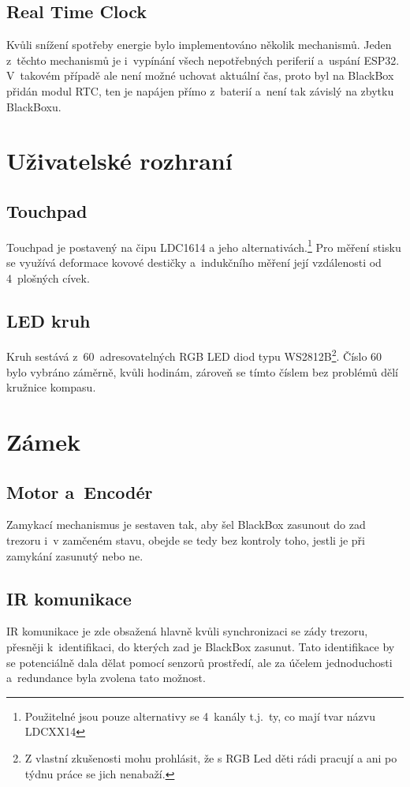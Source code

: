 \subsection{Real Time Clock}
Kvůli snížení spotřeby energie bylo implementováno několik mechanismů.
Jeden z~těchto mechanismů je i~vypínání všech nepotřebných periferií a~uspání ESP32. V~takovém případě ale není možné uchovat aktuální čas, proto byl na BlackBox přidán modul RTC, ten je napájen přímo z~baterií a~není tak závislý na zbytku BlackBoxu.

\section{Uživatelské rozhraní}

\subsection{Touchpad}
Touchpad je postavený na čipu LDC1614 a jeho alternativách.\footnote{Použitelné jsou pouze alternativy se 4~kanály t.j.~ty, co mají tvar názvu LDCXX14}
Pro měření stisku se využívá deformace kovové destičky a~indukčního měření její vzdálenosti od 4~plošných cívek.

\subsection{LED kruh}
Kruh sestává z~60~adresovatelných RGB LED diod typu WS2812B\footnote{Z vlastní zkušenosti mohu prohlásit, že s RGB Led děti rádi pracují a ani po týdnu práce se jich nenabaží.}.
Číslo 60 bylo vybráno záměrně, kvůli hodinám, zároveň se tímto číslem bez problémů dělí kružnice kompasu.


\section{Zámek}

\subsection{Motor a~Encodér}
Zamykací mechanismus je sestaven tak, aby šel BlackBox zasunout do zad trezoru i~v zamčeném stavu, obejde se tedy bez kontroly toho, jestli je při zamykání zasunutý nebo ne.

\subsection{IR komunikace}
IR komunikace je zde obsažená hlavně kvůli synchronizaci se zády trezoru, přesněji k~identifikaci, do kterých zad je BlackBox zasunut.
Tato identifikace by se potenciálně dala dělat pomocí senzorů prostředí, ale za účelem jednoduchosti a~redundance byla zvolena tato možnost.

